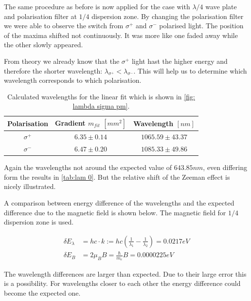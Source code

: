 \documentclass[]{article}
\begin{document}
The same procedure as before is now applied for the case with $\lambda/4$ wave plate and polarisation filter at $1/4$ dispersion zone. By changing the polarisation filter we were able to observe the switch from $\sigma^+$ and $\sigma^-$ polarised light. The position of the maxima shifted not continuously. It was more like one faded away while the other slowly appeared.

From theory we already know that the $\sigma^+$ light hast the higher energy and therefore the shorter wavelength: $\lambda_{\sigma^+} < \lambda_{\sigma^-}$. This will help us to determine which wavelength corresponds to which polarisation.

\begin{table}[H]
\centering
\begin{tabular}{c|c|c}
Polarisation & Gradient $m_{fit}$ $[mm^2]$ & Wavelength $[nm]$ \\ \hline\hline
$\sigma^+$ & $6.35 \pm 0.14$  & $1065.59 \pm 43.37$  \\ \hline
$\sigma^-$ & $6.47 \pm 0.20$  & $1085.33 \pm 49.86$  
\end{tabular}
\caption{Calculated wavelengths for the linear fit which is shown in \autoref{fig: lambda sigma pm}.}
\label{tab: lam sigmas}
\end{table}

Again the wavelengths not around the expected value of $643.85nm$, even differing form the results in \autoref{tab:lam 0}. But the relative shift of the Zeeman effect is nicely illustrated.

A comparison between energy difference of the wavelengths and the expected difference due to the magnetic field is shown below. The magnetic field for $1/4$ dispersion zone is used.

\begin{align}
\delta E_\lambda &= hc\cdot k := hc\left(\frac{1}{\lambda_1}- \frac{1}{\lambda_2}\right) = 0.0217 eV \\
\delta E_B &= 2\mu_B B = \frac{\hbar}{m_e}B = 0.0000225 eV 
\label{eq: 10^3 faktor}
\end{align}

The wavelength differences are larger than expected. Due to their large error this is a possibility. For wavelengths closer to each other the energy difference could become the expected one.
\end{document}
